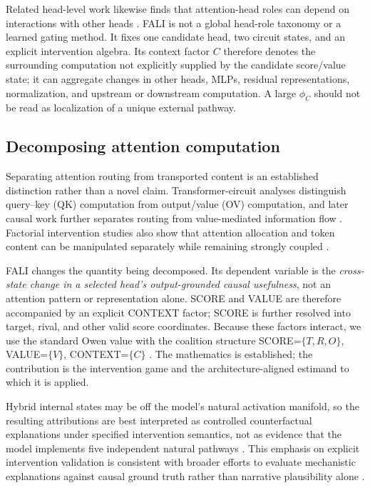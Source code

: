 Related head-level work likewise finds that attention-head roles can depend on interactions with other heads \citep{nam2025causalhead}. FALI is not a global head-role taxonomy or a learned gating method. It fixes one candidate head, two circuit states, and an explicit intervention algebra. Its context factor $C$ therefore denotes the surrounding computation not explicitly supplied by the candidate score/value state; it can aggregate changes in other heads, MLPs, residual representations, normalization, and upstream or downstream computation. A large $\phi_C$ should not be read as localization of a unique external pathway.

\subsection{Decomposing attention computation}\label{sec:rw-attention}

Separating attention routing from transported content is an established distinction rather than a novel claim. Transformer-circuit analyses distinguish query--key (QK) computation from output/value (OV) computation, and later causal work further separates routing from value-mediated information flow \citep{elhage2021mathematical,franco2025attentioncausal,wang2026fewshot}. Factorial intervention studies also show that attention allocation and token content can be manipulated separately while remaining strongly coupled \citep{zhu2026lexical}.

FALI changes the quantity being decomposed. Its dependent variable is the \emph{cross-state change in a selected head's output-grounded causal usefulness}, not an attention pattern or representation alone. SCORE and VALUE are therefore accompanied by an explicit CONTEXT factor; SCORE is further resolved into target, rival, and other valid score coordinates. Because these factors interact, we use the standard Owen value with the coalition structure SCORE=$\{T,R,O\}$, VALUE=$\{V\}$, CONTEXT=$\{C\}$ \citep{owen1977values}. The mathematics is established; the contribution is the intervention game and the architecture-aligned estimand to which it is applied.

Hybrid internal states may be off the model's natural activation manifold, so the resulting attributions are best interpreted as controlled counterfactual explanations under specified intervention semantics, not as evidence that the model implements five independent natural pathways \citep{grant2025divergent}. This emphasis on explicit intervention validation is consistent with broader efforts to evaluate mechanistic explanations against causal ground truth rather than narrative plausibility alone \citep{mueller2025mib}.

